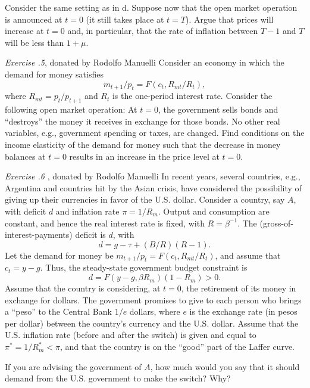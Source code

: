   Consider the same setting as in d.  Suppose now that
the open market operation is announced at $t=0$ (it still takes
place at $t=T$).  Argue that prices will increase at $t=0$ and,
in particular, that the rate of inflation between $T-1$ and $T$
will be less than $1+\mu$.

\medskip
\noindent
{\it Exercise \the\chapternum.5}, donated by Rodolfo Manuelli
\medskip\noindent
Consider an economy in which the demand for money satisfies
$$ m_{t+1}/p_t = F(c_t, R_{mt}/R_t), $$
where $R_{mt} = p_t/p_{t+1}$ and $R_t$ is the one-period interest rate.
Consider the following open market operation: At $t=0$, the government
sells bonds and ``destroys'' the money it receives in exchange for those bonds.
No other real variables, e.g., government spending or taxes, are changed.
Find conditions on the income elasticity of the demand for money such
that the decrease in money balances at $t=0$ results in an increase in
the price level at $t=0$.


\medskip\noindent
{\it Exercise \the\chapternum.6} , donated by Rodolfo
Manuelli
\medskip\noindent
In recent years, several countries, e.g., Argentina and countries
hit by the Asian crisis, have considered the possibility of
giving up their currencies in favor of the U.S. dollar.  Consider a country,
say $A$, with deficit $d$ and inflation rate $\pi = 1/R_m$.  Output and
consumption are constant, and hence the real interest rate is fixed,
with $R = \beta^{-1}$.  The (gross-of-interest-payments) deficit is $d$, with
$$ d = g - \tau + (B/R)(R-1).  $$
Let the demand for money be $m_{t+1}/p_t = F(c_t, R_{mt}/R_t)$, and assume
that $c_t = y - g$.  Thus, the steady-state government budget constraint is
$$ d = F(y-g, \beta R_m)(1-R_m) > 0.  $$
Assume that the country is considering, at $t=0$, the retirement of its money
in exchange for dollars.  The government promises to give to each person who
brings a ``peso''
 to the Central Bank $1/e$ dollars, where $e$ is the exchange
rate (in pesos per dollar) between the country's currency and the U.S. dollar.
Assume that the U.S. inflation rate (before and after the switch) is given
and equal to $\pi^* = 1/R_m^* < \pi$, and that the country is on the ``good''
part of the Laffer curve.
\medskip


 If you are advising the government of $A$, how much would you
say that it should demand from the U.S. government to make the switch?  Why?
\medskip


